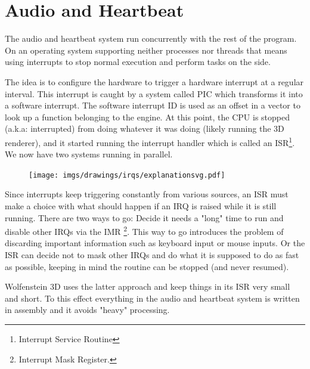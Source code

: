 \section{Audio and Heartbeat}
The audio and heartbeat system run concurrently with the rest of the program. On an operating system supporting neither processes nor threads that means using interrupts to stop normal execution and perform tasks on the side.\\
\par
The idea is to configure the hardware to trigger a hardware interrupt at a regular interval. This interrupt is caught by a system called PIC which transforms it into a software interrupt. The software interrupt ID is used as an offset in a vector to look up a function belonging to the engine. At this point, the CPU is stopped (a.k.a: interrupted) from doing whatever it was doing (likely running the 3D renderer), and it started running the interrupt handler which is called an ISR\footnote{Interrupt Service Routine}. We now have two systems running in parallel.\\
\par
\begin{figure}[H]
\centering
\texttt{[image: imgs/drawings/irqs/explanationsvg.pdf]}
 \end{figure}
\par
\par
 Since interrupts keep triggering constantly from various sources, an ISR must make a choice with what should happen if an IRQ is raised while it is still running. There are two ways to go: Decide it needs a "long" time to run and disable other IRQs via the IMR \footnote{Interrupt Mask Register.}. This way to go introduces the problem of discarding important information such as keyboard input or mouse inputs. Or the ISR can decide not to mask other IRQs and do what it is supposed to do as fast as possible, keeping in mind the routine can be stopped (and never resumed).\\
 \par
 Wolfenstein 3D uses the latter approach and keep things in its ISR very small and short. To this effect everything in the audio and heartbeat system is written in assembly and it avoids "heavy" processing.

